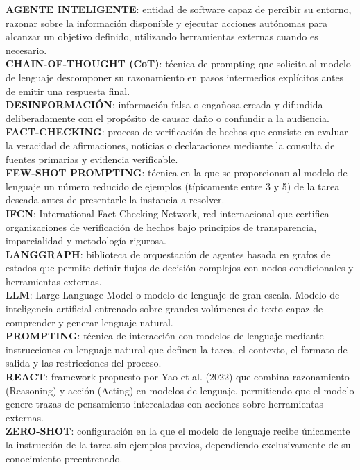 \textbf{AGENTE INTELIGENTE}: entidad de software capaz de percibir su entorno, razonar sobre la información disponible y ejecutar acciones autónomas para alcanzar un objetivo definido, utilizando herramientas externas cuando es necesario.\\

\textbf{CHAIN-OF-THOUGHT (CoT)}: técnica de prompting que solicita al modelo de lenguaje descomponer su razonamiento en pasos intermedios explícitos antes de emitir una respuesta final.\\

\textbf{DESINFORMACIÓN}: información falsa o engañosa creada y difundida deliberadamente con el propósito de causar daño o confundir a la audiencia.\\

\textbf{FACT-CHECKING}: proceso de verificación de hechos que consiste en evaluar la veracidad de afirmaciones, noticias o declaraciones mediante la consulta de fuentes primarias y evidencia verificable.\\

\textbf{FEW-SHOT PROMPTING}: técnica en la que se proporcionan al modelo de lenguaje un número reducido de ejemplos (típicamente entre 3 y 5) de la tarea deseada antes de presentarle la instancia a resolver.\\

\textbf{IFCN}: International Fact-Checking Network, red internacional que certifica organizaciones de verificación de hechos bajo principios de transparencia, imparcialidad y metodología rigurosa.\\

\textbf{LANGGRAPH}: biblioteca de orquestación de agentes basada en grafos de estados que permite definir flujos de decisión complejos con nodos condicionales y herramientas externas.\\

\textbf{LLM}: Large Language Model o modelo de lenguaje de gran escala. Modelo de inteligencia artificial entrenado sobre grandes volúmenes de texto capaz de comprender y generar lenguaje natural.\\

\textbf{PROMPTING}: técnica de interacción con modelos de lenguaje mediante instrucciones en lenguaje natural que definen la tarea, el contexto, el formato de salida y las restricciones del proceso.\\

\textbf{REACT}: framework propuesto por Yao et al. (2022) que combina razonamiento (Reasoning) y acción (Acting) en modelos de lenguaje, permitiendo que el modelo genere trazas de pensamiento intercaladas con acciones sobre herramientas externas.\\

\textbf{ZERO-SHOT}: configuración en la que el modelo de lenguaje recibe únicamente la instrucción de la tarea sin ejemplos previos, dependiendo exclusivamente de su conocimiento preentrenado.
